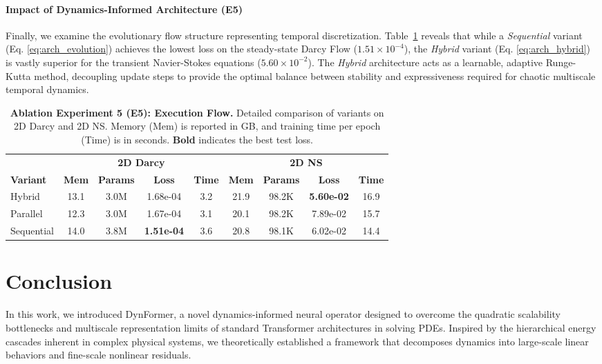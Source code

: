 \documentclass[final,3p,times]{elsarticle}
\begin{document}
\paragraph{Impact of Dynamics-Informed Architecture (E5)}
Finally, we examine the evolutionary flow structure representing temporal discretization. Table~\ref{tab:ablation_e5} reveals that while a \textit{Sequential} variant (Eq. \eqref{eq:arch_evolution}) achieves the lowest loss on the steady-state Darcy Flow ($1.51 \times 10^{-4}$), the \textit{Hybrid} variant (Eq. \eqref{eq:arch_hybrid}) is vastly superior for the transient Navier-Stokes equations ($5.60 \times 10^{-2}$). The \textit{Hybrid} architecture acts as a learnable, adaptive Runge-Kutta method, decoupling update steps to provide the optimal balance between stability and expressiveness required for chaotic multiscale temporal dynamics.
\begin{table}[htbp]
  \centering
  \small
  \setlength{\tabcolsep}{4pt}
  \renewcommand{\arraystretch}{1.2}
  \caption{\textbf{Ablation Experiment 5 (E5): Execution Flow.} Detailed comparison of variants on 2D Darcy and 2D NS. Memory (Mem) is reported in GB, and training time per epoch (Time) is in seconds. \textbf{Bold} indicates the best test loss.}
  \label{tab:ablation_e5}
  \begin{tabular}{l c c c c c c c c}
    \toprule
    & \multicolumn{4}{c}{\textbf{2D Darcy}} & \multicolumn{4}{c}{\textbf{2D NS}} \\
    \cmidrule(lr){2-5} \cmidrule(lr){6-9}
    \textbf{Variant} & \textbf{Mem} & \textbf{Params} & {\textbf{Loss}} & \textbf{Time} & \textbf{Mem} & \textbf{Params} & {\textbf{Loss}} & \textbf{Time} \\
    \midrule
    Hybrid & 13.1 & 3.0M & 1.68e-04 & 3.2 & 21.9 & 98.2K & {\textbf{5.60e-02}} & 16.9 \\
    Parallel & 12.3 & 3.0M & 1.67e-04 & 3.1 & 20.1 & 98.2K & 7.89e-02 & 15.7 \\
    Sequential & 14.0 & 3.8M & {\textbf{1.51e-04}} & 3.6 & 20.8 & 98.1K & 6.02e-02 & 14.4 \\
    \bottomrule
  \end{tabular}
\end{table}


\section{Conclusion}
In this work, we introduced DynFormer, a novel dynamics-informed neural operator designed to overcome the quadratic scalability bottlenecks and multiscale representation limits of standard Transformer architectures in solving PDEs. Inspired by the hierarchical energy cascades inherent in complex physical systems, we theoretically established a framework that decomposes dynamics into large-scale linear behaviors and fine-scale nonlinear residuals. 
\end{document}

